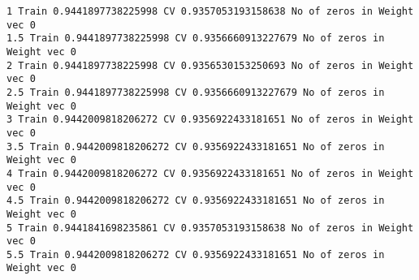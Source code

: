 \documentclass[11pt]{article}
\begin{document}
    \begin{Verbatim}[commandchars=\\\{\}]
1 Train 0.9441897738225998 CV 0.9357053193158638 No of zeros in Weight vec 0
1.5 Train 0.9441897738225998 CV 0.9356660913227679 No of zeros in Weight vec 0
2 Train 0.9441897738225998 CV 0.9356530153250693 No of zeros in Weight vec 0
2.5 Train 0.9441897738225998 CV 0.9356660913227679 No of zeros in Weight vec 0
3 Train 0.9442009818206272 CV 0.9356922433181651 No of zeros in Weight vec 0
3.5 Train 0.9442009818206272 CV 0.9356922433181651 No of zeros in Weight vec 0
4 Train 0.9442009818206272 CV 0.9356922433181651 No of zeros in Weight vec 0
4.5 Train 0.9442009818206272 CV 0.9356922433181651 No of zeros in Weight vec 0
5 Train 0.9441841698235861 CV 0.9357053193158638 No of zeros in Weight vec 0
5.5 Train 0.9442009818206272 CV 0.9356922433181651 No of zeros in Weight vec 0

    \end{Verbatim}
\end{document}
